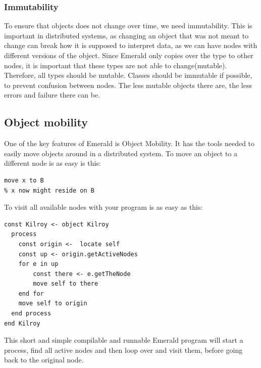 \subsubsection{Immutability}
To ensure that objects does not change over time, we need immutability. This is important in distributed systems, as changing an object that was not meant to change can break how it is supposed to interpret data, as we can have nodes with different versions of the object. Since Emerald only copies over the type to other nodes, it is important that these types are not able to change(mutable). Therefore, all types should be mutable. Classes should be immutable if possible, to prevent confusion between nodes. The less mutable objects there are, the less errors and failure there can be.

\subsection{Object mobility}
One of the key features of Emerald is Object Mobility. It has the tools needed to easily move objects around in a distributed system. To move an object to a different node is as easy is this:
\begin{lstlisting}[language=emerald]
% x is created and resides on A
move x to B
% x now might reside on B
\end{lstlisting}
To visit all available nodes with your program is as easy as this\cite{noauthor_emerald_nodate}:
\begin{lstlisting}[language=emerald]
const Kilroy <- object Kilroy
  process
    const origin <-  locate self
    const up <- origin.getActiveNodes
    for e in up
      	const there <- e.getTheNode
      	move self to there
    end for
    move self to origin
  end process
end Kilroy
\end{lstlisting}
This short and simple compilable and runnable Emerald program will start a process, find all active nodes and then loop over and visit them, before going back to the original node.

